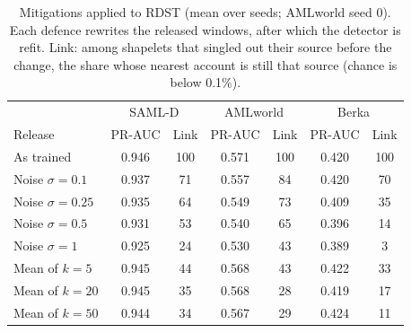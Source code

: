 \begin{table}[t]
\caption{Mitigations applied to RDST (mean over seeds; AMLworld seed 0). Each defence rewrites the released windows, after which the detector is refit. Link: among shapelets that singled out their source before the change, the share whose nearest account is still that source (chance is below 0.1\%).}
\label{tab:rdstdef}
\small\setlength{\tabcolsep}{2.5pt}
\centering
\begin{tabular}{lcccccc}
\toprule
& \multicolumn{2}{c}{SAML-D} & \multicolumn{2}{c}{AMLworld} & \multicolumn{2}{c}{Berka} \\
Release & PR-AUC & Link & PR-AUC & Link & PR-AUC & Link \\
\midrule
As trained & 0.946 & 100 & 0.571 & 100 & 0.420 & 100 \\
Noise $\sigma{=}0.1$ & 0.937 & 71 & 0.557 & 84 & 0.420 & 70 \\
Noise $\sigma{=}0.25$ & 0.935 & 64 & 0.549 & 73 & 0.409 & 35 \\
Noise $\sigma{=}0.5$ & 0.931 & 53 & 0.540 & 65 & 0.396 & 14 \\
Noise $\sigma{=}1$ & 0.925 & 24 & 0.530 & 43 & 0.389 & 3 \\
Mean of $k{=}5$ & 0.945 & 44 & 0.568 & 43 & 0.422 & 33 \\
Mean of $k{=}20$ & 0.945 & 35 & 0.568 & 28 & 0.419 & 17 \\
Mean of $k{=}50$ & 0.944 & 34 & 0.567 & 29 & 0.424 & 11 \\
\bottomrule\end{tabular}\end{table}
